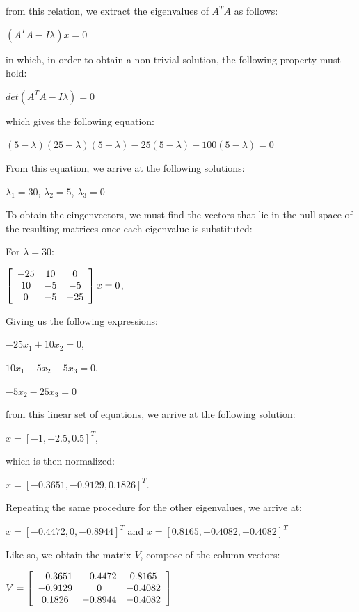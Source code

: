 \documentclass[]{article}
\begin{document}
from this relation, we extract the eigenvalues of $A^TA$ as follows:
	
\centerline {
	$(A^TA - I \lambda) x = 0$
}

in which, in order to obtain a non-trivial solution, the following property must hold:

\centerline {
	$det(A^TA - I \lambda) = 0$
}

which gives the following equation:

\centerline {
	$(5- \lambda) (25 - \lambda)(5 - \lambda) - 25(5 - \lambda) - 100(5 - \lambda) = 0 $
}

From this equation, we arrive at the following solutions: 

\centerline {
	$\lambda_{1} = 30$, $\lambda_{2} = 5$, $\lambda_{3} = 0$ 
}

To obtain the eingenvectors, we must find the vectors that lie in the null-space of the resulting matrices once
each eigenvalue is substituted:

For $\lambda = 30$: 

\centerline{ $\left[ {\begin{array}{*{20}c}
		-25 & 10 & 0 \\
		10 & -5 & -5 \\ 
		0 & -5 & -25   
		\end{array} } \right] x = 0$,  }

Giving us the following expressions: 

\centerline {
	$-25x_{1} + 10x_{2} = 0$, 
}
\centerline {
	$10x_{1} - 5x_{2} - 5x_{3} =0$, 
}
\centerline {
	$-5x_{2} - 25x_{3} = 0$	
}

from this linear set of equations, we arrive at the following solution: 

\centerline {
	$x = [-1, -2.5, 0.5]^T$,
}

which is then normalized: 

\centerline {
	$x = [-0.3651, -0.9129, 0.1826]^T$.
}

Repeating the same procedure for the other eigenvalues, we arrive at: 

\centerline {
	$x = [-0.4472, 0, -0.8944]^T$ and $x = [0.8165, -0.4082, -0.4082]^T$
}

Like so, we obtain the matrix $V$, compose of the column vectors: 

\centerline{ $V = \left[ {\begin{array}{*{20}c}
		-0.3651 & -0.4472 & 0.8165 \\
		-0.9129 & 0 & -0.4082 \\ 
		0.1826 & -0.8944 & -0.4082   
		\end{array} } \right]$ 
}
	
\end{document}
